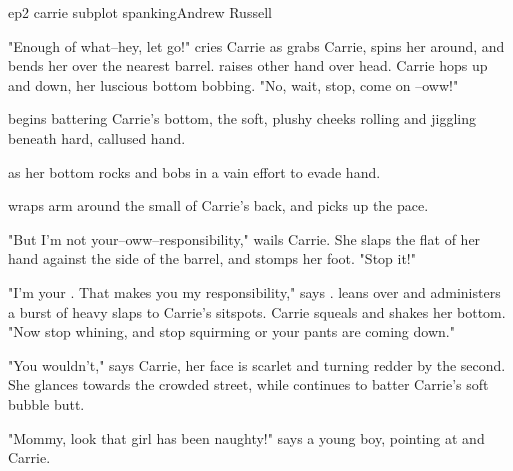 \documentclass{book}
\begin{document}
\begin{childnode}{ep2 carrie subplot spanking}{Andrew Russell}




    "Enough of what--hey, let go!" cries Carrie as \name{} grabs Carrie, spins her around, and bends her over the nearest barrel. \HeShe{} raises \hisher{} other hand over \hisher{} head. Carrie 
    hops up and down, her luscious bottom bobbing. "No, wait, stop, come on \nickname{}--oww!"

    \name{} begins battering Carrie's bottom, the soft, plushy cheeks rolling and jiggling beneath \hisher{} hard, callused hand.

     as her bottom rocks and bobs in a vain effort to evade \names{} hand.

     \HeShe{} wraps \hisher{} arm around the small of Carrie's back, and picks up the pace.

    "But I'm not your--oww--responsibility," wails Carrie. She slaps the flat of her hand against the side of the barrel, and stomps her foot. "Stop it!"

    "I'm your . That makes you my responsibility," says \name{}. \HeShe{} leans over and administers a burst of heavy slaps to
    Carrie's sitspots. Carrie squeals and shakes her bottom. "Now stop whining, and stop squirming or your pants are coming down."

    "You wouldn't," says Carrie, her face is scarlet and turning redder by the second. She glances towards the crowded street, while \name{} continues to batter Carrie's soft bubble butt.

    "Mommy, look that girl has been naughty!" says a young boy, pointing at \name{} and Carrie.


\end{childnode}
\end{document}

